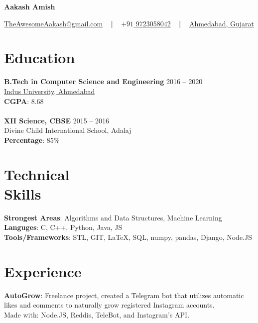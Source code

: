\documentclass[margin, centered]{res}
\begin{document}
	\begin{center}
		\hspace{-\hoffset}
		\huge\bf{Aakash Amish}
	\end{center}
	\begin{center}
		\hspace{-\hoffset}
		\href{mailto:theawesomeaakash@gmail.com}{TheAwesomeAakash@gmail.com}
		~ \textbf{|} ~
		\href{tel:+919723058042}{\(+91\) 9723058042}
		~ \textbf{|} ~
		\href{https://goo.gl/maps/QqRrJzxewF82}{Ahmedabad, Gujarat}
	\end{center}

	\begin{resume}
		\section{Education}
			\textbf{B.Tech in Computer Science and Engineering} \hfill 2016 – 2020 \\
			\href{https://www.indusuni.ac.in/}{Indus University, Ahmedabad}\\
			\textbf{CGPA}: 8.68 \\ 
			\\
			\textbf{XII Science, CBSE} \hfill 2015 – 2016 \\
			Divine Child International School, Adalaj \\
			\textbf{Percentage}: 85\%
		\\		
		\section{Technical \\ Skills}
			\textbf{Strongest Areas}: Algorithms and Data Structures, Machine Learning\\
			\textbf{Languges}: C, C++, Python, Java, JS\\
			\textbf{Tools/Frameworks}: STL, GIT, \LaTeX, SQL, numpy, pandas, Django, Node.JS
		\\
		\section{Experience}
			\textbf{AutoGrow}:
			Freelance project, created a Telegram bot that utilizes automatic likes and comments to naturally grow registered Instagram accounts.\\
			Made with: Node.JS, Reddis, TeleBot, and Instagram's API.
		\\

\end{resume}
\end{document}
